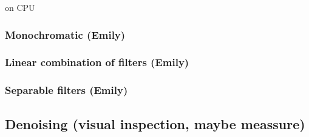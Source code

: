 \documentclass{article}
\begin{document}
on CPU


\subsubsection{Monochromatic (Emily)}

\subsubsection{Linear combination of filters (Emily)}

\subsubsection{Separable filters (Emily)}


\subsection{ Denoising (visual inspection, maybe meassure)}
\end{document}
